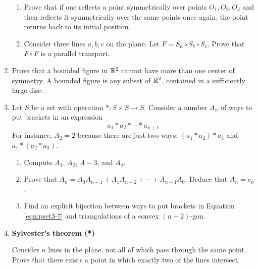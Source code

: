 \documentclass[../main.tex]{subfiles}
\begin{document}
\begin{enumerate}
\begin{enumerate}
        \item Prove that if one reflects a point symmetrically over points $O_1,O_2,O_3$ and then reflects it symmetrically over the same points once again, the point returns back to its initial position.
        \item Consider three lines $a,b,c$ on the plane. Let $F=S_a\circ S_b\circ S_c$. Prove that $F\circ F$ is a parallel transport.
    \end{enumerate}
    \item Prove that a bounded figure in $\mathbb{R}^2$ cannot have more than one center of symmetry. A bounded figure is any subset of $\mathbb{R}^2$, contained in a sufficiently large disc.
    \item Let $S$ be a set with operation $*:S\times S\to S$. Consider a number $A_n$ of ways to put brackets in an expression
    \begin{equation}\label{eqn:pset3-7}
        a_1*a_2*\cdots*a_{n+1}
    \end{equation}
    For instance, $A_2=2$ because there are just two ways: $(a_1*a_2)*a_3$ and $a_1*(a_2*a_3)$.
    \begin{enumerate}
        \item Compute $A_1$, $A_2$, $A-3$, and $A_4$.
        \item Prove that $A_n=A_0A_{n-1}+A_1A_{n-2}+\cdots+A_{n-1}A_0$. Deduce that $A_n=c_n$.
        \item Find an explicit bijection between ways to put brackets in Equation \ref{eqn:pset3-7} and triangulations of a convex $(n+2)$-gon.
    \end{enumerate}
    \item \textbf{Sylvester's theorem (*)}\par
    Consider $n$ lines in the plane, not all of which pass through the same point. Prove that there exists a point in which exactly two of the lines intersect.
\end{enumerate}
\end{document}

